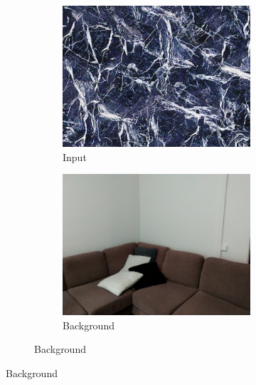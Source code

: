 \begin{figure}[]
    \centering    
    \begin{subfigure}{\textwidth}
        \centering
        \begin{subfigure}{0.24\textwidth}
            \centering
            \includegraphics[width=\textwidth]{images/04-experiment02/sofa/marble/target.jpg}
            \caption*{Input}
        \end{subfigure}
        \hfill
        \begin{subfigure}{0.24\textwidth}
            \centering
            \includegraphics[width=\textwidth]{images/04-experiment02/sofa/bg.jpg}
            \caption*{Background}

\end{subfigure}
\end{subfigure}
\end{figure}
